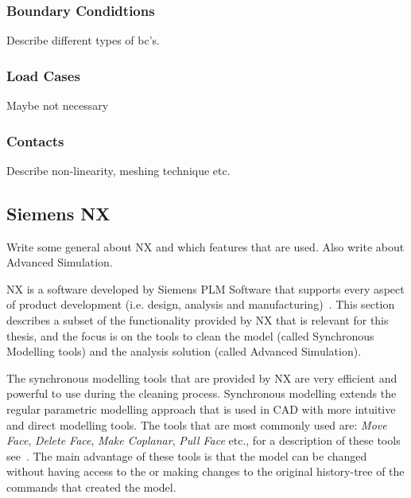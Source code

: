 \subsubsection{Boundary Condidtions} %
\label{ssub:boundary_condidtions}
Describe different types of bc's.

\subsubsection{Load Cases} %
\label{ssub:load_cases}
Maybe not necessary

\subsubsection{Contacts} %
\label{ssub:contacts}
Describe non-linearity, meshing technique etc.


\subsection{Siemens NX} %
\label{sub:siemens_nx}
Write some general about NX and which features that are used. Also write about Advanced Simulation.

NX\texttrademark{} is a software developed by Siemens PLM Software that supports every aspect of product development (i.e. design, analysis and manufacturing)~\cite{siemensnx}. This section describes a subset of the functionality provided by NX that is relevant for this thesis, and the focus is on the tools to clean the model (called Synchronous Modelling  tools) and the analysis solution (called Advanced Simulation).~\cite[p.~36ff.]{goncharov14}

The synchronous modelling tools that are provided by NX are very efficient and powerful to use during the cleaning process. Synchronous modelling extends the regular parametric modelling approach that is used in CAD with more intuitive and direct modelling tools. The tools that are most commonly used are: \textit{Move Face}, \textit{Delete Face}, \textit{Make Coplanar}, \textit{Pull Face} etc., for a description of these tools see~\cite{goncharov14}. The main advantage of these tools is that the model can be changed without having access to the or making changes to the original history-tree of the commands that created the model.


